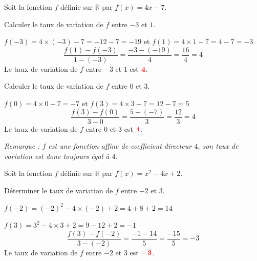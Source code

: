 \documentclass[11pt,a4paper]{article}  %
\begin{document}
	Soit la fonction $f$ définie sur $\mathbb{R}$ par $f(x)=4x-7$.
	\begin{enumMet}
		\item Calculer le taux de variation de $f$ entre $-3$ et $1$.
		
		\begin{corrBox}
			$f(-3)=4\times(-3)-7=-12-7=-19$ \quad {} \quad et \quad $f(1)=4\times 1-7=4-7=-3$ \quad {}
			\[\dfrac{f(1)-f(-3)}{1-(-3)}=\dfrac{-3-(-19)}{4}=\dfrac{16}{4}=4\]
			Le taux de variation de $f$ entre $-3$ et $1$ est $\mRouge{4}$. \quad {}
		\end{corrBox}
		
		\item {} Calculer le taux de variation de $f$ entre $0$ et $3$.
		
		\begin{corrBox}
			$f(0)=4\times 0-7=-7$ \quad {} \quad et \quad $f(3)=4\times 3-7=12-7=5$ \quad \bareme{0,5}
			\[\dfrac{f(3)-f(0)}{3-0}=\dfrac{5-(-7)}{3}=\dfrac{12}{3}=4\]
			Le taux de variation de $f$ entre $0$ et $3$ est $\mRouge{4}$. \quad \bareme{1}
			
			\emph{Remarque : $f$ est une fonction affine de coefficient directeur $4$, son taux de variation est donc toujours égal à $4$.}
		\end{corrBox}
	\end{enumMet}
	
	\exerciceDS { $-$ (3 points)}
	
	Soit la fonction $f$ définie sur $\mathbb{R}$ par $f(x)=x^2-4x+2$.
	
	Déterminer le taux de variation de $f$ entre $-2$ et $3$.
	
	\begin{corrBox}
		$f(-2)=(-2)^2-4\times (-2)+2=4+8+2=14$ \quad {}
		
		$f(3)=3^2-4\times 3+2=9-12+2=-1$ \quad \bareme{1}
		\[\dfrac{f(3)-f(-2)}{3-(-2)}=\dfrac{-1-14}{5}=\dfrac{-15}{5}=-3\]
		Le taux de variation de $f$ entre $-2$ et $3$ est $\mRouge{-3}$. \quad \bareme{1}
	\end{corrBox}
	
	\newpage
	
	
\end{document}
